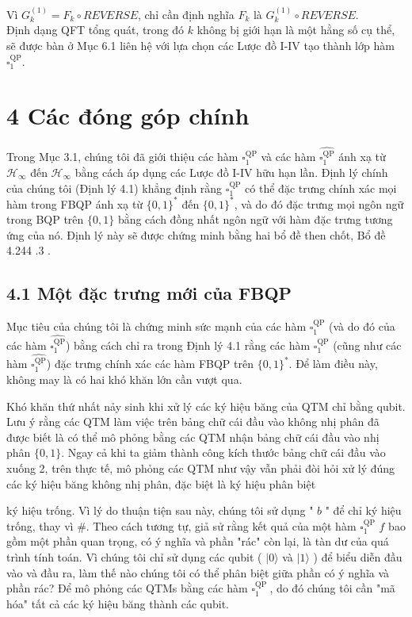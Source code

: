 \documentclass[10pt]{article}
\begin{document}
Vì $G_{k}^{(1)}=F_{k} \circ R E V E R S E$, chỉ cần định nghĩa $F_{k}$ là $G_{k}^{(1)} \circ R E V E R S E$.\\
Định dạng QFT tổng quát, trong đó $k$ không bị giới hạn là một hằng số cụ thể, sẽ được bàn ở Mục 6.1 liên hệ với lựa chọn các Lược đồ I-IV tạo thành lớp hàm $\square_{1}^{\mathrm{QP}}$.

\section*{4 Các đóng góp chính}
Trong Mục 3.1, chúng tôi đã giới thiệu các hàm $\square_{1}^{\mathrm{QP}}$ và các hàm $\widehat{\square_{1}^{\mathrm{QP}}}$ ánh xạ từ $\mathcal{H}_{\infty}$ đến $\mathcal{H}_{\infty}$ bằng cách áp dụng các Lược đồ I-IV hữu hạn lần. Định lý chính của chúng tôi (Định lý 4.1) khẳng định rằng $\square_{1}^{\mathrm{QP}}$ có thể đặc trưng chính xác mọi hàm trong FBQP ánh xạ từ $\{0,1\}^{*}$ đến $\{0,1\}^{*}$, và do đó đặc trưng mọi ngôn ngữ trong BQP trên $\{0,1\}$ bằng cách đồng nhất ngôn ngữ với hàm đặc trưng tương ứng của nó. Định lý này sẽ được chứng minh bằng hai bổ đề then chốt, Bổ đề 4.244 .3 .

\subsection*{4.1 Một đặc trưng mới của FBQP}
Mục tiêu của chúng tôi là chứng minh sức mạnh của các hàm $\square_{1}^{\mathrm{QP}}$ (và do đó của các hàm $\widehat{\square_{1}^{\mathrm{QP}}}$) bằng cách chỉ ra trong Định lý 4.1 rằng các hàm $\square_{1}^{\mathrm{QP}}$ (cũng như các hàm $\widehat{\square_{1}^{\mathrm{QP}}}$) đặc trưng chính xác các hàm FBQP trên $\{0,1\}^{*}$. Để làm điều này, không may là có hai khó khăn lớn cần vượt qua.

Khó khăn thứ nhất nảy sinh khi xử lý các ký hiệu băng của QTM chỉ bằng qubit. Lưu ý rằng các QTM làm việc trên bảng chữ cái đầu vào không nhị phân đã được biết là có thể mô phỏng bằng các QTM nhận bảng chữ cái đầu vào nhị phân $\{0,1\}$. Ngay cả khi ta giảm thành công kích thước bảng chữ cái đầu vào xuống 2, trên thực tế, mô phỏng các QTM như vậy vẫn phải đòi hỏi xử lý đúng các ký hiệu băng không nhị phân, đặc biệt là ký hiệu phân biệt

ký hiệu trống. Vì lý do thuận tiện sau này, chúng tôi sử dụng " $b$ " để chỉ ký hiệu trống, thay vì $\#$. Theo cách tương tự, giả sử rằng kết quả của một hàm $\square_{1}^{\mathrm{QP}}$ $f$ bao gồm một phần quan trọng, có ý nghĩa và phần "rác" còn lại, là tàn dư của quá trình tính toán. Vì chúng tôi chỉ sử dụng các qubit ( $|0\rangle$ và $|1\rangle$ ) để biểu diễn đầu vào và đầu ra, làm thế nào chúng tôi có thể phân biệt giữa phần có ý nghĩa và phần rác? Để mô phỏng các QTMs bằng các hàm $\square_{1}^{\text {QP }}$, do đó chúng tôi cần "mã hóa" tất cả các ký hiệu băng thành các qubit.
\end{document}
